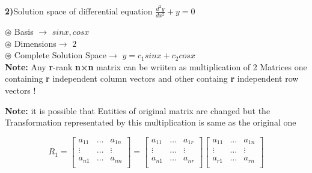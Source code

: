 \documentclass[a4paper,11pt]{article}
\numberwithin{equation}{section}
\begin{document}
\begin{itemize}
\textbf{2)}Solution space of differential equation $\frac{d^2y}{d x^2}+y=0$

\textbf{$\circledast$ }Basis $\rightarrow$ $sinx,cosx$\\
\textbf{$\circledast$ }Dimensions$\rightarrow$ $2$\\
\textbf{$\circledast$ }Complete Solution Space$\rightarrow$ $y=c_1sinx+c_2cosx$\\


\textbf{Note:} Any \textbf{r}-rank \textbf{n×n} matrix can be wriiten as multiplication of 2 Matrices one containing \textbf{r} independent column vectors and other containg \textbf{r}    independent row vectors !\\
        \vspace{0.5cm}
        \begin{center}
        \end{center}
        \vspace{0.5cm}
        \textbf{Note:} it is possible that Entities of original matrix are changed but the Transformation representated by this multiplication is same as the original one
        \vspace{5pt}
        \begin{center}
            \[R_1=
                \begin{bmatrix}
                    a_{11} & \dots & a_{1n}\\
                    \vdots & \dots & \vdots \\
                    a_{n1} & \dots & a_{nn}\\
                \end{bmatrix}=
                \begin{bmatrix}
                    a_{11} & \dots & a_{1r}\\
                    \vdots & \dots & \vdots \\
                    a_{n1} & \dots & a_{nr}\\
                \end{bmatrix}
                \begin{bmatrix}
                    a_{11} & \dots & a_{1n}\\
                    \vdots & \dots & \vdots \\
                    a_{r1} & \dots & a_{rn}\\
                \end{bmatrix}
            \]\\

\end{center}
\end{itemize}
\end{document}
